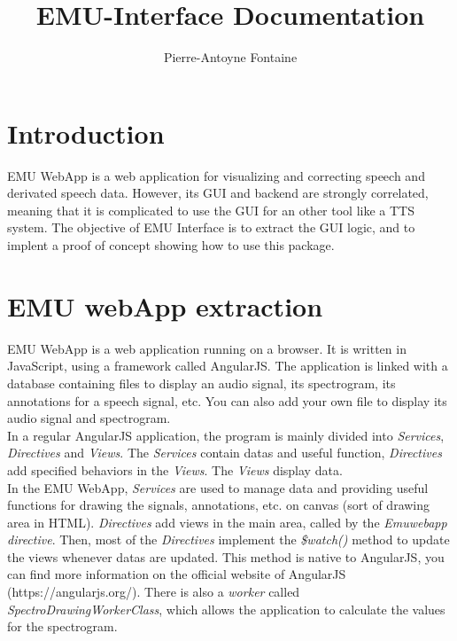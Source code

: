 \documentclass{article}
\title{EMU-Interface Documentation}
\author{Pierre-Antoyne Fontaine}
\begin{document}
\maketitle

\section*{Introduction}

EMU WebApp is a web application for visualizing and correcting speech and derivated speech data. However, its GUI and backend are strongly correlated, meaning that it is complicated to use the GUI for an other tool like a TTS system. The objective of EMU Interface is to extract the GUI logic, and to implent a proof of concept showing how to use this package.

\section{EMU webApp extraction}

EMU WebApp is a web application running on a browser. It is written in JavaScript, using a framework called AngularJS. 
The application is linked with a database containing files to display an audio signal, its spectrogram, its annotations for a speech signal, etc. You can also add your own file to display its audio signal and spectrogram. \\

In a regular AngularJS application, the program is mainly divided into \textit{Services}, \textit{Directives} and \textit{Views}. The \textit{Services} contain datas and useful function, \textit{Directives} add specified behaviors in the \textit{Views}. The \textit{Views} display data.  \\

In the EMU WebApp, \textit{Services} are used to manage data and providing useful functions for drawing the signals, annotations, etc. on canvas (sort of drawing area in HTML).
\textit{Directives} add views in the main area, called by the \textit{Emuwebapp directive}. Then, most of the \textit{Directives} implement the \textit{\$watch()} method to update the views whenever datas are updated. This method is native to AngularJS, you can find more information on the official website of AngularJS (https://angularjs.org/). 
There is also a \textit{worker} called \textit{SpectroDrawingWorkerClass}, which allows the application to calculate the values for the spectrogram. \\
\end{document}

